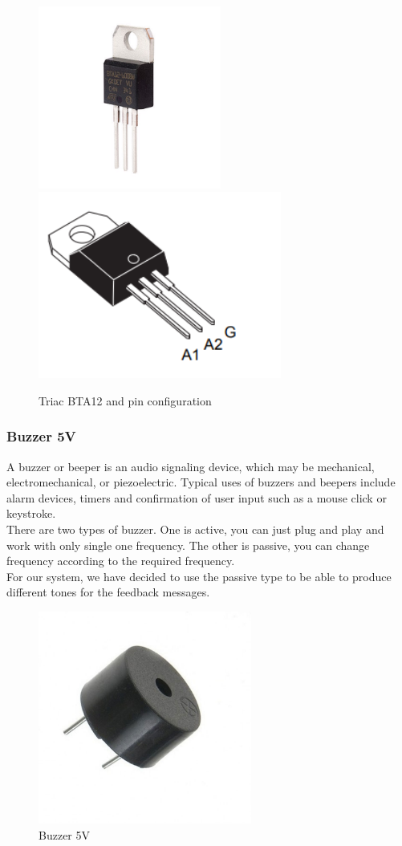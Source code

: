 \documentclass[a4paper]{article}
\begin{document}
\begin{figure}[h!]
\centering
{{\includegraphics[width=6cm]{images/bta_triac.jpg} }}
\qquad
{{\includegraphics[width=8cm]{images/btapin.PNG} }}
\caption*{Triac BTA12 and pin configuration}
\end{figure}
\subsubsection{Buzzer 5V}
A buzzer or beeper is an audio signaling device, which may be mechanical, electromechanical, or piezoelectric. Typical uses of buzzers and beepers include alarm devices, timers and confirmation of user input such as a mouse click or keystroke.\\
There are two types of buzzer. One is active, you can just plug and play and work with only single one frequency. The other is passive, you can change frequency according to the required frequency.\\
For our system, we have decided to use the passive type to be able to produce different tones for the feedback messages.
\newpage
\begin{figure}[h!]
\centering
\includegraphics[width=7cm]{images/buzzer.jpg}
\caption*{Buzzer 5V}
\end{figure}
\end{document}
